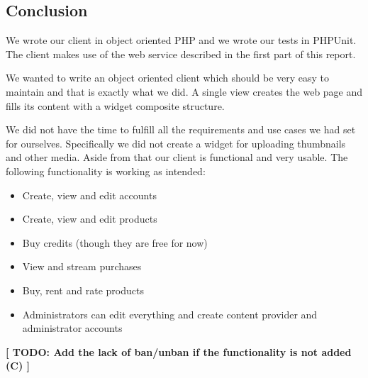 \subsection{Conclusion}
We wrote our client in object oriented PHP and we wrote our tests in PHPUnit. The client makes use of the web service described in the first part of this report.

We wanted to write an object oriented client which should be very easy to maintain and that is exactly what we did. A single view creates the web page and fills its content with a widget composite structure.

We did not have the time to fulfill all the requirements and use cases we had set for ourselves. Specifically we did not create a widget for uploading thumbnails and other media. Aside from that our client is functional and very usable. The following functionality is working as intended:
\begin{itemize}
\item Create, view and edit accounts
\item Create, view and edit products
\item Buy credits (though they are free for now)
\item View and stream purchases
\item Buy, rent and rate products
\item Administrators can edit everything and create content provider and administrator accounts
\end{itemize}

\textbf{[ TODO: Add the lack of ban/unban if the functionality is not added (C) ]}
\newpage